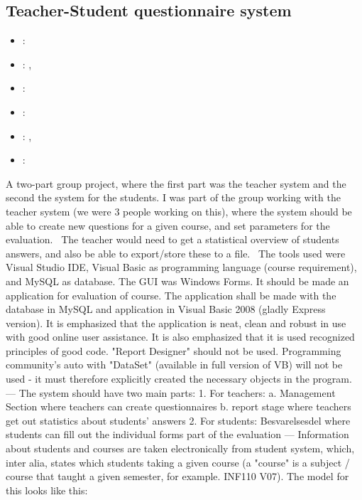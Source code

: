 \subsection{Teacher-Student questionnaire system}
\label{sec:inf116_teacher_system}
\begin{itemize} 
	\item {}: 
	\item {}: , 
	\item {}: 
	\item {}: 
	\item {}: , 
	\item {}: 
\end{itemize} 
A two-part group project, where the first part was the teacher system and the second the system for the students.
I was part of the group working with the teacher system (we were 3 people working on this), where the system should be able to create new questions for a given course, 
and set parameters for the evaluation. 
The teacher would need to get a statistical overview of students answers, and also be able to export/store these to a file. 
The tools used were Visual Studio IDE, Visual Basic as programming language (course requirement), and MySQL as database. 
The GUI was Windows Forms.
\vspace{0.5em}\newline
It should be made an application for evaluation of course. 
The application shall be made with the database in MySQL and application in Visual Basic 2008 (gladly Express version). 
It is emphasized that the application is neat, clean and robust in use with good online user assistance. 
It is also emphasized that it is used recognized principles of good code. "Report Designer" should not be used. 
Programming community's auto with "DataSet" (available in full version of VB) will not be used - it must therefore explicitly created the necessary objects in the program.
---
The system should have two main parts:
1. For teachers:
a. Management Section where teachers can create questionnaires
b. report stage where teachers get out statistics about students' answers
2. For students: Besvarelsesdel where students can fill out the individual forms part of the evaluation
---
Information about students and courses are taken electronically from student system, which, inter alia, states which students taking a given course 
(a "course" is a subject / course that taught a given semester, for example. INF110 V07). 
The model for this looks like this:

